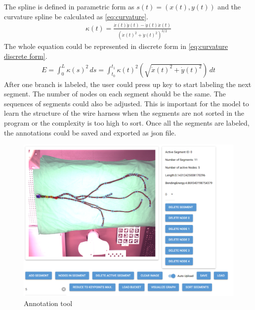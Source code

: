    The spline is defined in parametric form as $s(t) = (x(t),y(t))$ and the curvature spline be calculated as \autoref{eq:curvature}. 
    \begin{equation}
        \begin{aligned}
            \kappa(t) = \frac{\dot{x}(t) \ddot{y}(t) - \dot{y}(t) \ddot{x}(t)}{(\dot{x}(t)^2 + \dot{y}(t)^2)^{3/2}}
            \label{eq:curvature}
        \end{aligned}
    \end{equation}
    The whole equation could be represented in discrete form in \autoref{eq:curvature discrete form}.
    \begin{equation}
        \begin{aligned}
            E = \int_{0}^{L} \kappa(s)^2 \, ds = \int_{t_0}^{t_1} \kappa(t)^2 \left( \sqrt{\dot{x}(t)^2 + \dot{y}(t)^2} \right) \, dt
            \label{eq:curvature discrete form}
        \end{aligned}
    \end{equation}
    After one branch is labeled, the user could press up key to start labeling the next segment. The number of nodes on each segment should be the same. The sequences of 
    segments could also be adjusted. This is important for the model to learn the structure of the wire harness when the segments are not sorted in the program or the complexity 
    is too high to sort. Once all the segments are labeled, the annotations could be saved and exported as json file.
    \begin{figure}
        \centering
        \includegraphics[width=0.9\linewidth]{example_images/NiceGUIInterface.png}
        \caption{Annotation tool}
        \label{Annotation tool}
    \end{figure}

